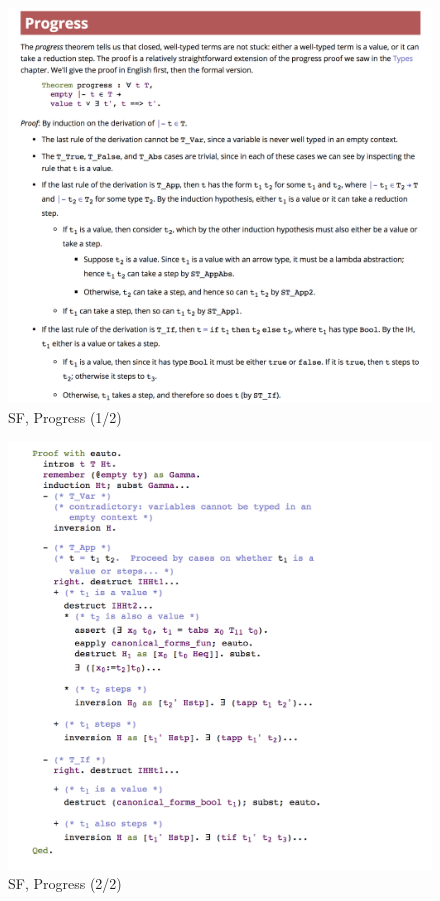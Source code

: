 \documentclass[preprint,authoryear]{elsarticle}
\begin{document}
\begin{figure}[t]
  \includegraphics[width=\textwidth]{figures/sf-progress-1.png}
  \caption{SF, Progress (1/2)}
  \label{fig:sf-progress-1}
\end{figure}  

\begin{figure}[t]
  \includegraphics[width=\textwidth]{figures/sf-progress-2.png}
  \caption{SF, Progress (2/2)}
  \label{fig:sf-progress-2}
\end{figure}  
\end{document}
